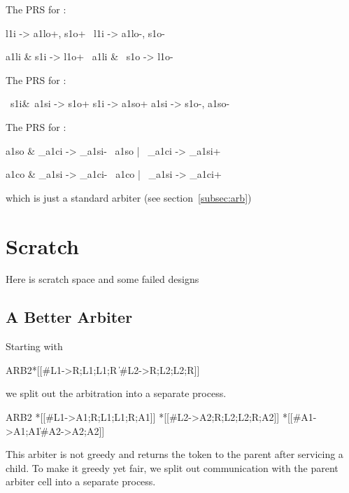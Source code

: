 \documentclass[aer.tex]{subfiles}
\begin{document}
\noindent The PRS for :

\begin{prs2}
l1i -> a1lo+, s1o+
~l1i -> a1lo-, s1o-

a1li & s1i -> l1o+
~a1li & ~s1o -> l1o-
\end{prs2}

\noindent The PRS for :

\begin{prs2}
~s1i&~a1si -> s1o+
s1i -> a1so+
a1si -> s1o-, a1so-
\end{prs2}

\noindent The PRS for :

\begin{prs2}
a1so & _a1ci -> _a1si-
~a1so | ~_a1ci -> _a1si+

a1co & _a1si -> _a1ci-
~a1co | ~_a1si -> _a1ci+
\end{prs2}

\noindent which is just a standard arbiter (see section~\ref{subsec:arb})

\section{Scratch}

Here is scratch space and some failed designs

\subsection{A Better Arbiter}

Starting with

\begin{csp}
ARB2\equiv*
  *[[#{L1}->R;L1;L1;R
    \|#{L2}->R;L2;L2;R]]
\end{csp}

we split out the arbitration into a separate process.

\begin{csp}
ARB2\equiv
*[[#{L1}->A1;R;L1;L1;R;A1]] \pll
*[[#{L2}->A2;R;L2;L2;R;A2]] \pll
*[[#{A1}->A1;A1\|#{A2}->A2;A2]]
\end{csp}

This arbiter is not greedy and returns the token to the parent after servicing a child.
To make it greedy yet fair, we split out communication with the parent arbiter cell into a separate process.
\end{document}

